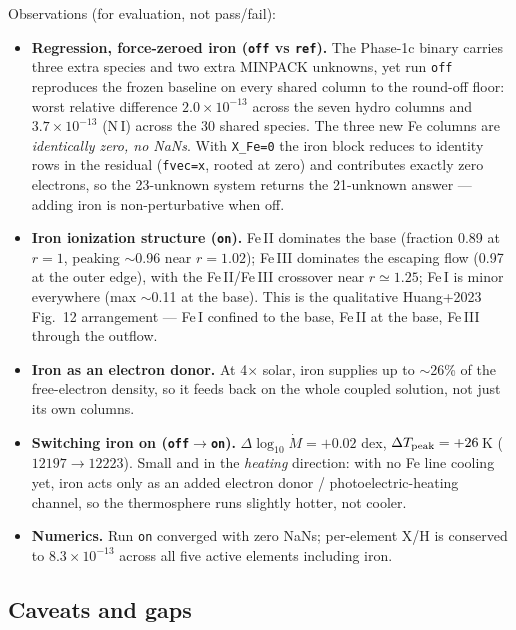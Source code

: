 \documentclass[english,a4paper]{kiseon_memo}
\begin{document}
Observations (for evaluation, not pass/fail):
\begin{itemize}
\item \textbf{Regression, force-zeroed iron (\texttt{off} vs \texttt{ref}).} The
  Phase-1c binary carries three extra species and two extra MINPACK unknowns, yet
  run \texttt{off} reproduces the frozen baseline on every shared column to the
  round-off floor: worst relative difference $2.0\times10^{-13}$ across the seven
  hydro columns and $3.7\times10^{-13}$ (N\,I) across the 30 shared species. The
  three new Fe columns are \emph{identically zero, no NaNs}. With \verb|X_Fe=0| the
  iron block reduces to identity rows in the residual (\verb|fvec=x|, rooted at
  zero) and contributes exactly zero electrons, so the 23-unknown system returns
  the 21-unknown answer --- adding iron is non-perturbative when off.
\item \textbf{Iron ionization structure (\texttt{on}).} Fe\,II dominates the base
  (fraction 0.89 at $r=1$, peaking $\sim$0.96 near $r=1.02$); Fe\,III dominates the
  escaping flow (0.97 at the outer edge), with the Fe\,II/Fe\,III crossover near
  $r\simeq1.25$; Fe\,I is minor everywhere (max $\sim$0.11 at the base). This is
  the qualitative Huang+2023 Fig.~12 arrangement --- Fe\,I confined to the base,
  Fe\,II at the base, Fe\,III through the outflow.
\item \textbf{Iron as an electron donor.} At 4$\times$ solar, iron supplies up to
  $\sim$26\% of the free-electron density, so it feeds back on the whole coupled
  solution, not just its own columns.
\item \textbf{Switching iron on (\texttt{off}$\rightarrow$\texttt{on}).}
  $\Delta\log_{10}\dot M = +0.02$ dex, $\Delta T_{\rm peak} = +26$\,K
  ($12197\rightarrow12223$). Small and in the \emph{heating} direction: with no Fe
  line cooling yet, iron acts only as an added electron donor /
  photoelectric-heating channel, so the thermosphere runs slightly hotter, not
  cooler.
\item \textbf{Numerics.} Run \texttt{on} converged with zero NaNs; per-element X/H
  is conserved to $8.3\times10^{-13}$ across all five active elements including iron.
\end{itemize}

\subsection{Caveats and gaps}
\end{document}
